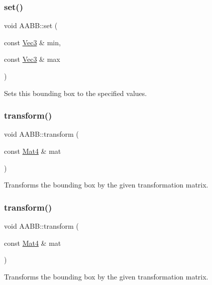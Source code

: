 \subsubsection{\texorpdfstring{set()}{set()}\hspace{0.1cm}{\footnotesize\ttfamily [2/2]}}
{\footnotesize\ttfamily void A\+A\+B\+B\+::set (\begin{DoxyParamCaption}\item[{const \hyperlink{classVec3}{Vec3} \&}]{min,  }\item[{const \hyperlink{classVec3}{Vec3} \&}]{max }\end{DoxyParamCaption})}

Sets this bounding box to the specified values. \mbox{\label{classAABB_a452039f8d83a813398c23e1d47787038}} 
\subsubsection{\texorpdfstring{transform()}{transform()}\hspace{0.1cm}{\footnotesize\ttfamily [1/2]}}
{\footnotesize\ttfamily void A\+A\+B\+B\+::transform (\begin{DoxyParamCaption}\item[{const \hyperlink{classMat4}{Mat4} \&}]{mat }\end{DoxyParamCaption})}

Transforms the bounding box by the given transformation matrix. \mbox{\label{classAABB_a452039f8d83a813398c23e1d47787038}} 
\subsubsection{\texorpdfstring{transform()}{transform()}\hspace{0.1cm}{\footnotesize\ttfamily [2/2]}}
{\footnotesize\ttfamily void A\+A\+B\+B\+::transform (\begin{DoxyParamCaption}\item[{const \hyperlink{classMat4}{Mat4} \&}]{mat }\end{DoxyParamCaption})}

Transforms the bounding box by the given transformation matrix. \mbox{\label{classAABB_a08f4e4ad7a09b30f79ab80a0c6056ede}} 
